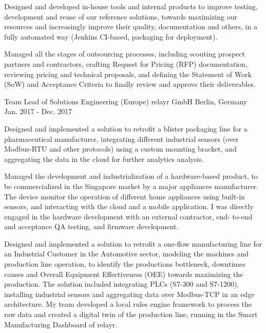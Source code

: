 \begin{cventries}
{\begin{cvitems}
        \item {Designed and developed in-house tools and internal products to improve testing, development and reuse of our reference solutions, towards maximizing our resources and increasingly improve their quality, documentation and others, in a fully automated way (Jenkins CI-based, packaging for deployment).}
        \item {Managed all the stages of outsourcing processes, including scouting prospect partners and contractors, crafting Request for Pricing (RFP) documentation, reviewing pricing and technical proposals, and defining the Statement of Work (SoW) and Acceptance Criteria to finally review and approve their deliverables.}
      \end{cvitems}
    }

  \cventry
    {Team Lead of Solutions Engineering (Europe)} %
    {relayr GmbH} %
    {Berlin, Germany} %
    {Jan. 2017 - Dec. 2017} %
    {
      \begin{cvitems} %
        \item {Designed and implemented a solution to retrofit a blister packaging line for a pharmaceutical manufacturer, integrating different industrial sensors (over Modbus-RTU and other protocols) using a custom mounting bracket, and aggregating the data in the cloud for further analytics analysis.}
        \item {Managed the development and industrialization of a hardware-based product, to be commercialized in the Singapore market by a major appliances manufacturer. The device monitor the operation of different home appliances using built-in sensors, and interacting with the cloud and a mobile application. I was directly engaged in the hardware development with an external contractor, end- to-end and acceptance QA testing, and firmware development.}
        \item {Designed and implemented a solution to retrofit a one-flow manufacturing line for an Industrial Customer in the Automotive sector, modeling the machines and production line operation, to identify the productions bottleneck, downtimes causes and Overall Equipment Effectiveness (OEE) towards maximizing the production. The solution included integrating  PLCs (S7-300 and S7-1200), installing industrial sensors and aggregating data over Modbus-TCP in an edge architecture.  My team developed a local rules engine framework to process the raw data and created a digital twin of the production line, running in the Smart Manufacturing Dashboard of relayr.}

\end{cvitems}}
\end{cventries}
